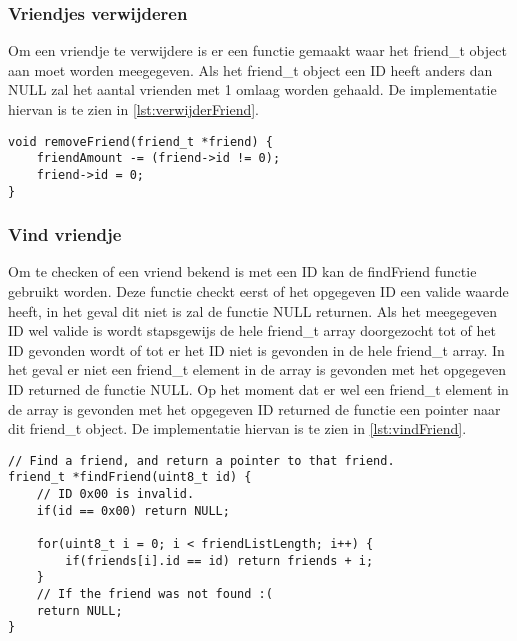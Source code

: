     \subsubsection{Vriendjes verwijderen}
        Om een vriendje te verwijdere is er een functie gemaakt waar het friend\_t object aan moet worden meegegeven. Als het friend\_t object een ID heeft anders dan NULL zal het aantal vrienden met 1 omlaag worden gehaald. De implementatie hiervan is te zien in \autoref{lst:verwijderFriend}.
        \begin{lstlisting}[caption={Verwijder vriendje},captionpos=b,label={lst:verwijderFriend},style=c,xleftmargin=.\textwidth,xrightmargin=.\textwidth]
void removeFriend(friend_t *friend) {
    friendAmount -= (friend->id != 0);
    friend->id = 0;
}
        \end{lstlisting}

    \subsubsection{Vind vriendje}
        Om te checken of een vriend bekend is met een ID kan de findFriend functie gebruikt worden. Deze functie checkt eerst of het opgegeven ID een valide waarde heeft, in het geval dit niet is zal de functie NULL returnen. Als het meegegeven ID wel valide is wordt stapsgewijs de hele friend\_t array doorgezocht tot of het ID gevonden wordt of tot er het ID niet is gevonden in de hele friend\_t array. In het geval er niet een friend\_t element in de array is gevonden met het opgegeven ID returned de functie NULL. Op het moment dat er wel een friend\_t element in de array is gevonden met het opgegeven ID returned de functie een pointer naar dit friend\_t object. De implementatie hiervan is te zien in \autoref{lst:vindFriend}.
        \begin{lstlisting}[caption={Vind vriendje},captionpos=b,label={lst:vindFriend},style=c,xleftmargin=.\textwidth,xrightmargin=.\textwidth]
// Find a friend, and return a pointer to that friend.
friend_t *findFriend(uint8_t id) {
    // ID 0x00 is invalid.   
    if(id == 0x00) return NULL;

    for(uint8_t i = 0; i < friendListLength; i++) {
        if(friends[i].id == id) return friends + i;
    }
    // If the friend was not found :(
    return NULL;
}
        \end{lstlisting}